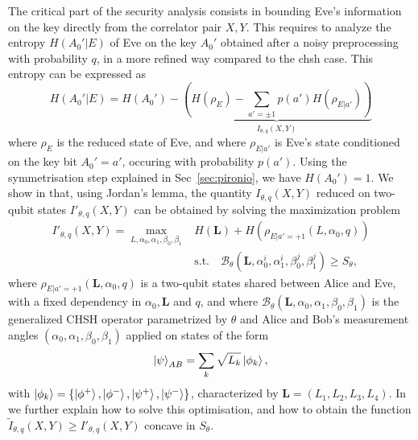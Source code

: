 The critical part of the security analysis consists in bounding Eve's information on the key directly from the correlator pair $X,Y$.
This requires to analyze the entropy $H(A_0'|E)$ of Eve on the key $A_0'$ obtained after a noisy preprocessing with probability $q$, in a more refined way compared to the \acrshort{chsh} case.
This entropy can be expressed as 
\begin{equation}
	H(A_0'|E) = H(A_0') - \underbrace{\left(H(\rho_E) - \sum_{a'=\pm1}p(a')H(\rho_{E|a'})\right)}_{I_{\theta,q}(X,Y)}
\end{equation}
where $\rho_E$ is the reduced state of Eve, and where $\rho_{E|a'}$ is Eve's state conditioned on the key bit $A_0'=a'$, occuring with probability $p(a')$.
Using the symmetrisation step explained in Sec~\ref{sec:pironio}, we have $H(A_0')=1$.
We show in \cite{Sekatski2021} that, using Jordan's lemma, the quantity $I_{\theta,q}(X,Y)$ reduced on two-qubit states $I'_{\theta,q}(X,Y)$ can be obtained by solving the maximization problem
\begin{equation}
	\begin{split}
		I'_{\theta,q}(X,Y) = \max_{L,\alpha_0,\alpha_1,\beta_0,\beta_1} & H(\mathbf{L}) + H(\rho_{E|a'=+1}(L,\alpha_0,q)) \\
		&\mathrm{s.t.}\quad 
		\mathcal{B}_\theta (\mathbf{L},\alpha_0^i,\alpha_1^i,\beta_0^j,\beta_1^j) \geq S_\theta,
	\end{split}
\end{equation}
where $\rho_{E|a'=+1}(\mathbf{L},\alpha_0,q)$ is a two-qubit states shared between Alice and Eve, with a fixed dependency in $\alpha_0,\mathbf{L}$ and $q$, and where $\mathcal{B}_\theta (\mathbf{L},\alpha_0,\alpha_1,\beta_0,\beta_1)$ is the generalized CHSH operator parametrized by $\theta$ and Alice and Bob's measurement angles $(\alpha_0,\alpha_1,\beta_0,\beta_1)$ applied on states of the form
\begin{equation}
	\ket{\psi}_{AB} = \sum_k \sqrt{L_k} \ket{\phi_k},
	\label{eq:}
\end{equation}
with $\ket{\phi_k}=\{\ket{\phi^+},\ket{\phi^-},\ket{\psi^+},\ket{\psi^-}\}$, characterized by $\mathbf{L}=(L_1,L_2,L_3,L_4)$.
In \cite{Sekatski2021} we further explain how to solve this optimisation, and how to obtain the function $\tilde{I}_{\theta,q}(X,Y)\geq I'_{\theta,q}(X,Y)$ concave in $S_\theta$.

